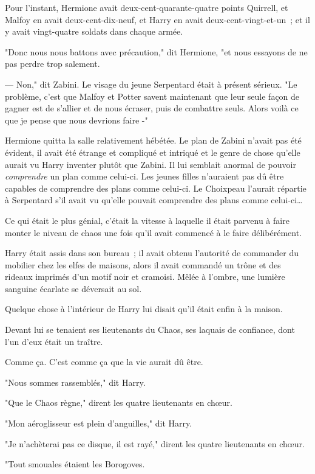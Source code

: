 Pour l'instant, Hermione avait deux-cent-quarante-quatre points Quirrell, et Malfoy en avait deux-cent-dix-neuf, et Harry en avait deux-cent-vingt-et-un~; et il y avait vingt-quatre soldats dans chaque armée.

"Donc nous nous battons avec précaution," dit Hermione, "et nous essayons de ne pas perdre trop salement.

--- Non," dit Zabini. Le visage du jeune Serpentard était à présent sérieux. "Le problème, c'est que Malfoy et Potter savent maintenant que leur seule façon de gagner est de s'allier et de nous écraser, puis de combattre seuls. Alors voilà ce que je pense que nous devrions faire -"

Hermione quitta la salle relativement hébétée. Le plan de Zabini n'avait pas été évident, il avait été étrange et compliqué et intriqué et le genre de chose qu'elle aurait vu Harry inventer plutôt que Zabini. Il lui semblait anormal de pouvoir \emph{comprendre} un plan comme celui-ci. Les jeunes filles n'auraient pas dû être capables de comprendre des plans comme celui-ci. Le Choixpeau l'aurait répartie à Serpentard s'il avait vu qu'elle pouvait comprendre des plans comme celui-ci…

\later

Ce qui était le plus génial, c'était la vitesse à laquelle il était parvenu à faire monter le niveau de chaos une fois qu'il avait commencé à le faire délibérément.

Harry était assis dans son bureau~; il avait obtenu l'autorité de commander du mobilier chez les elfes de maisons, alors il avait commandé un trône et des rideaux imprimés d'un motif noir et cramoisi. Mêlée à l'ombre, une lumière sanguine écarlate se déversait au sol.

Quelque chose à l'intérieur de Harry lui disait qu'il était enfin à la maison.

Devant lui se tenaient ses lieutenants du Chaos, ses laquais de confiance, dont l'un d'eux était un traître.

Comme ça. C'est comme ça que la vie aurait dû être.

"Nous sommes rassemblés," dit Harry.

"Que le Chaos règne," dirent les quatre lieutenants en chœur.

"Mon aéroglisseur est plein d'anguilles," dit Harry.

"Je n'achèterai pas ce disque, il est rayé," dirent les quatre lieutenants en chœur.

"Tout smouales étaient les Borogoves.

